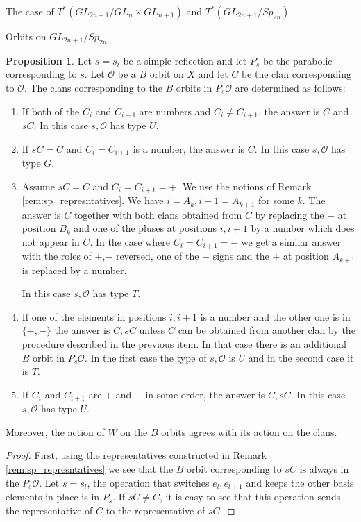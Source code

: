 \documentclass[12pt]{article}
\newcommand{\s}{\mathcal{O}}
\theoremstyle{plain}
\theoremstyle{definition}
\newtheorem{prop}[theorem]{Proposition}
\begin{document}
\begin{subsection}{The case of $T^*(GL_{2n+1}/GL_n\times GL_{n+1})$ and $T^*(GL_{2n+1}/Sp_{2n})$}
\begin{subsubsection}{Orbits on $GL_{2n+1}/Sp_{2n}$}
\begin{prop}
    Let $s=s_i$ be a simple reflection and let $P_s$ be the parabolic corresponding to $s$. Let $\s$ be a $B$ orbit on $X$ and let $C$ be the clan corresponding to $\s$. The clans corresponding to the $B$ orbits in $P_s\s$ are determined as follows:
    \begin{enumerate}
        \item If both of the $C_i$ and $C_{i+1}$ are numbers and $C_i\neq C_{i+1}$, the answer is $C$ and $sC$. In this case $s,\s$ has type $U$.
        \item If $sC=C$ and $C_i=C_{i+1}$ is a number, the answer is $C$. In this case $s,\s$ has type $G$.
        \item Assume $sC=C$ and $C_i=C_{i+1}=+$. We use the notions of Remark \ref{rem:sp_represntatives}. We have $i=A_{k},i+1=A_{k+1}$ for some $k$. The answer is $C$ together with both clans obtained from $C$ by replacing the $-$ at position $B_{k}$ and one of the pluses at positions $i,i+1$ by a number which does not appear in $C$. In the case where $C_i=C_{i+1}=-$ we get a similar answer with the roles of $+$,$-$ reversed, one of the $-$ signs and the $+$ at position $A_{k+1}$ is replaced by a number.
        
        In this case $s,\s$ has type $T$.

        \item If one of the elements in positions $i,i+1$ is a number and the other one is in $\{+,-\}$ the answer is $C,sC$ unless $C$ can be obtained from another clan by the procedure described in the previous item. In that case there is an additional $B$ orbit in $P_s\s$. In the first case the type of $s,\s$ is $U$ and in the second case it is $T$.
        
        \item If $C_i$ and $C_{i+1}$ are $+$ and $-$ in some order, the answer is $C,sC$. In this case $s,\s$ has type $U$.
        
    \end{enumerate}

    Moreover, the action of $W$ on the $B$ orbits agrees with its action on the clans.
\end{prop}
\begin{proof}
        First, using the representatives constructed in Remark \ref{rem:sp_represntatives} we see that the $B$ orbit corresponding to $sC$ is always in the $P_s\s$. Let $s=s_l$, the operation that switches $e_l,e_{l+1}$ and keeps the other basis elements in place is in $P_s$. If $sC\neq C$, it is easy to see that this operation sends the representative of $C$ to the representative of $sC$.


\end{proof}
\end{subsubsection}
\end{subsection}
\end{document}
